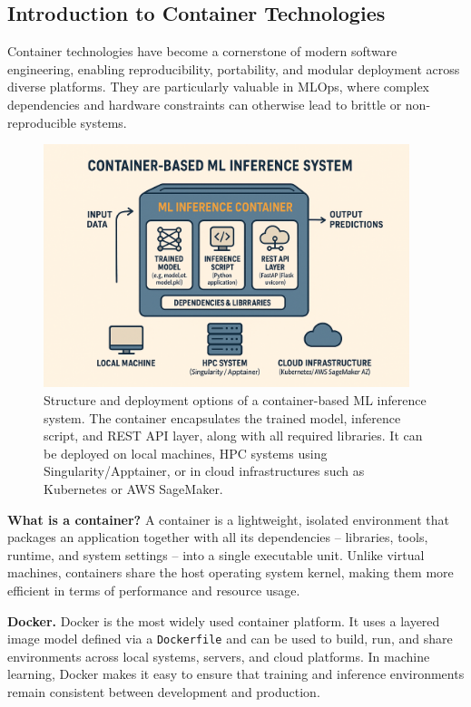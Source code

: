 \subsection{Introduction to Container Technologies}

Container technologies have become a cornerstone of modern software engineering, enabling reproducibility, portability, and modular deployment across diverse platforms. They are particularly valuable in MLOps, where complex dependencies and hardware constraints can otherwise lead to brittle or non-reproducible systems.

\begin{figure}[ht]
  \centering
  \includegraphics[width=0.95\textwidth]{images/mlops_containers.png}
  \caption{Structure and deployment options of a container-based ML inference system. 
  The container encapsulates the trained model, inference script, and REST API layer, along with all required libraries. It can be deployed on local machines, HPC systems using Singularity/Apptainer, or in cloud infrastructures such as Kubernetes or AWS SageMaker.}
  \label{fig:mlops-containers}
\end{figure}



{\bf What is a container?} A container is a lightweight, isolated environment that packages an application together with all its dependencies -- libraries, tools, runtime, and system settings -- into a single executable unit. Unlike virtual machines, containers share the host operating system kernel, making them more efficient in terms of performance and resource usage.

{\bf Docker.} Docker is the most widely used container platform. It uses a layered image model defined via a \texttt{Dockerfile} and can be used to build, run, and share environments across local systems, servers, and cloud platforms. In machine learning, Docker makes it easy to ensure that training and inference environments remain consistent between development and production.


